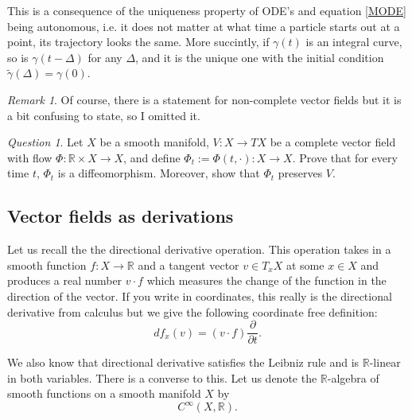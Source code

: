 \documentclass[12pt]{amsart}
\theoremstyle{remark}
\newtheorem{remark}{Remark}
\newtheorem{question}{Question}
\begin{document}
This is a consequence of the uniqueness property of ODE's and equation \eqref{MODE} being autonomous, i.e. it does not matter at what time a particle starts out at a point, its trajectory looks the same. More succintly, if $\gamma(t)$ is an integral curve, so is $\gamma(t-\Delta)$ for any $\Delta$, and it is the unique one with the initial condition $\tilde{\gamma}(\Delta)=\gamma(0)$.



\begin{remark}
Of course, there is a statement for non-complete vector fields but it is a bit confusing to state, so I omitted it.
\end{remark}

\begin{question}\label{qpres}
Let $X$ be a smooth manifold,  $V:X\to TX$ be a complete vector field with flow $\Phi:\mathbb{R}\times X\to X$, and define $\Phi_t:=\Phi(t,\cdot): X\to X$. Prove that for every time $t$, $\Phi_t$ is a diffeomorphism. Moreover, show that $\Phi_t$ preserves $V$.
\end{question}


\subsection{Vector fields as derivations}

Let us recall the  the directional derivative operation. This operation takes in a smooth function $f:X\to \mathbb{R}$ and a tangent vector $v\in T_xX$ at some $x\in X$ and produces a real number $v\cdot f$ which measures the change of the function in the direction of the vector. If you write in coordinates, this really is the directional derivative from calculus but we give the following coordinate free definition: $$df_x(v)=(v\cdot f) \frac{\partial}{\partial t}.$$

We also know that directional derivative satisfies the Leibniz rule and is $\mathbb{R}$-linear in both variables. There is a converse to this. Let us denote the $\mathbb{R}$-algebra of smooth functions on a smooth manifold $X$ by $$C^{\infty}(X,\mathbb{R}).$$
\end{document}
